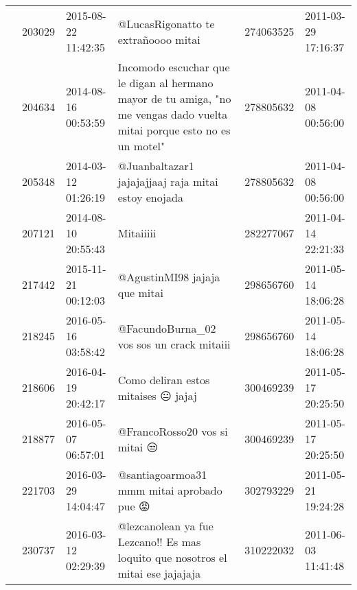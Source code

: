 \begin{tabular}{llllrl}
           & 203029  & 2015-08-22 11:42:35 &                                                                                                          @LucasRigonatto te extrañoooo mitai &   274063525 & 2011-03-29 17:16:37 \\
           & 204634  & 2014-08-16 00:53:59 &                     Incomodo escuchar que le digan al hermano mayor de tu amiga, "no me vengas dado vuelta mitai porque esto no es un motel" &   278805632 & 2011-04-08 00:56:00 \\
           & 205348  & 2014-03-12 01:26:19 &                                                                                          @Juanbaltazar1 jajajajjaaj raja mitai estoy enojada &   278805632 & 2011-04-08 00:56:00 \\
           & 207121  & 2014-08-10 20:55:43 &                                                                                                                                    Mitaiiiii &   282277067 & 2011-04-14 22:21:33 \\
           & 217442  & 2015-11-21 00:12:03 &                                                                                                                @AgustinMI98 jajaja que mitai &   298656760 & 2011-05-14 18:06:28 \\
           & 218245  & 2016-05-16 03:58:42 &                                                                                                    @FacundoBurna\_02 vos sos un crack mitaiii &   298656760 & 2011-05-14 18:06:28 \\
           & 218606  & 2016-04-19 20:42:17 &                                                                                                          Como deliran estos mitaises 😐 jajaj &   300469239 & 2011-05-17 20:25:50 \\
           & 218877  & 2016-05-07 06:57:01 &                                                                                                                @FrancoRosso20 vos si mitai 😒 &   300469239 & 2011-05-17 20:25:50 \\
           & 221703  & 2016-03-29 14:04:47 &                                                                                                    @santiagoarmoa31 mmm mitai aprobado pue 😡 &   302793229 & 2011-05-21 19:24:28 \\
           & 230737  & 2016-03-12 02:29:39 &                                                              @lezcanolean ya fue Lezcano!! Es mas loquito que nosotros el mitai ese jajajaja &   310222032 & 2011-06-03 11:41:48 \\

\end{tabular}
